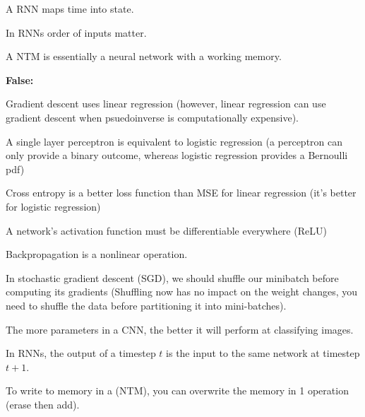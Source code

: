 A RNN maps time into state.

In RNNs order of inputs matter.

A NTM is essentially a neural network with a working memory.

\textbf{False:}

Gradient descent uses linear regression (however, linear regression can use gradient descent when psuedoinverse is computationally expensive).

A single layer perceptron is equivalent to logistic regression (a perceptron can only provide a binary outcome, whereas logistic regression provides a Bernoulli pdf)

Cross entropy is a better loss function than MSE for linear regression (it's better for logistic regression)

A network’s activation function must be differentiable everywhere (ReLU)

Backpropagation is a nonlinear operation.

In stochastic gradient descent (SGD), we should shuffle our minibatch before computing its gradients (Shuffling now has no impact on the weight changes, you need to shuffle the data before partitioning it into mini-batches).

The more parameters in a CNN, the better it will perform at classifying images.

In RNNs, the output of a timestep $t$ is the input to the same network at timestep $t + 1$.

To write to memory in a (NTM), you can overwrite the memory in 1 operation (erase then add).
